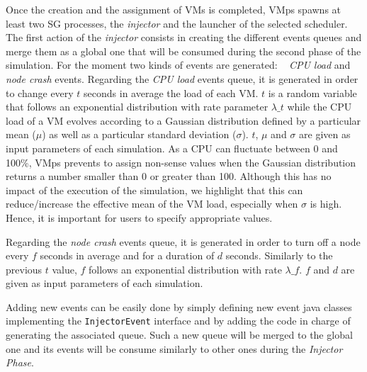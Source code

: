 \documentclass[conference]{IEEEtran}
\newcommand{\sg}{SimGrid\xspace}
\newcommand{\vmps}{VMps\xspace}
\begin{document}
Once the creation and the assignment of VMs is completed, \vmps spawns at least two SG processes, the \emph{injector} and the
launcher of the selected scheduler.
The first action of the \emph{injector} consists in creating the
different events queues and merge them as a global one  that will be consumed during the second phase of the
simulation.  For the moment two kinds of events are generated: ~\emph{
 CPU load}
and \emph{node crash} events.
%
Regarding the \emph{CPU load} events queue, it is generated in order to change every $t$
seconds in average the load of each VM. $t$ is a random variable that
follows an exponential distribution with rate parameter $\lambda\_t$
while the
CPU load of a VM evolves according to a Gaussian distribution defined by
a particular mean ($\mu$) as well as a particular standard deviation
($\sigma$). $t$, $\mu$ and $\sigma$ are given as input parameters of each
simulation.
As a CPU can fluctuate between 0 and 100\%, \vmps
prevents to assign non-sense values  when the Gaussian distribution returns a
number smaller than 0 or greater than 100. Although this has no impact
of the execution of the simulation, we highlight that this can  reduce/increase the
effective mean of the VM load, especially when $\sigma$ is high.
Hence, it is important for users to specify appropriate values.

Regarding the \emph{node crash} events queue, it is generated in order to
turn off a node every $f$ seconds in average and for a duration of $d$ seconds.
Similarly to the previous $t$ value, $f$ follows an exponential
distribution with rate $\lambda\_f$. $f$ and $d$ are given as input
parameters of each simulation.

Adding new events can be easily done by simply defining new event
java classes implementing the \texttt{InjectorEvent} interface and by
adding the code in charge of generating the associated queue. Such a
new queue will be merged to the global one and its events will be
consume similarly to other ones during the
\emph{Injector Phase}.
\end{document}
